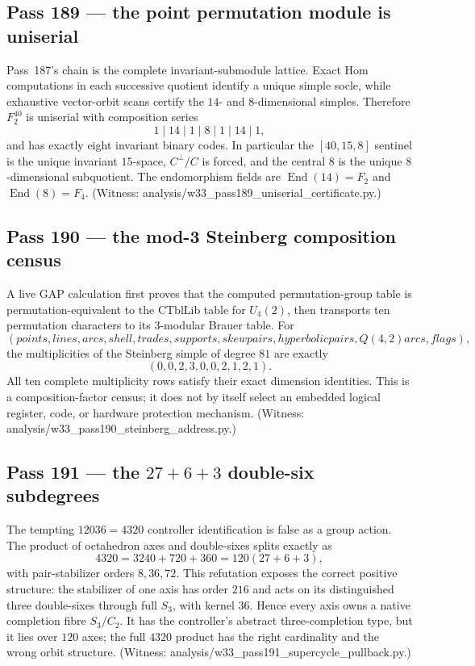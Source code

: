 \documentclass[12pt,a4paper]{article}
\def\mathbb#1{#1}%
\def\texttt#1{#1}%
\def\text#1{#1}%
\def\cdot{ }%
\theoremstyle{definition}
\begin{document}
\subsection{Pass 189 --- the point permutation module is uniserial}
\label{ssec:pass189}

Pass~187's chain is the complete invariant-submodule lattice.  Exact Hom
computations in each successive quotient identify a unique simple socle,
while exhaustive vector-orbit scans certify the $14$- and $8$-dimensional
simples.  Therefore $\mathbb F_2^{40}$ is uniserial with composition
series
\[
  1\mid14\mid1\mid8\mid1\mid14\mid1,
\]
and has exactly eight invariant binary codes.  In particular the
$[40,15,8]$ sentinel is the unique invariant $15$-space,
$C^\perp/C$ is forced, and the central $8$ is the unique
$8$-dimensional subquotient.  The endomorphism fields are
$\operatorname{End}(14)=\mathbb F_2$ and
$\operatorname{End}(8)=\mathbb F_4$. (Witness:
\texttt{analysis/w33\_pass189\_uniserial\_certificate.py}.)

\subsection{Pass 190 --- the mod-3 Steinberg composition census}
\label{ssec:pass190}

A live GAP calculation first proves that the computed permutation-group
table is permutation-equivalent to the CTblLib table for $U_4(2)$, then
transports ten permutation characters to its $3$-modular Brauer table.
For
\[
 (\text{points, lines, arcs, shell, trades, supports, skew pairs,
 hyperbolic pairs, }Q(4,2)\text{ arcs, flags}),
\]
the multiplicities of the Steinberg simple of degree $81$ are exactly
\[
  \boxed{(0,0,2,3,0,0,2,1,2,1)}.
\]
All ten complete multiplicity rows satisfy their exact dimension
identities.  This is a composition-factor census; it does not by itself
select an embedded logical register, code, or hardware protection
mechanism. (Witness:
\texttt{analysis/w33\_pass190\_steinberg\_address.py}.)

\subsection{Pass 191 --- the $27+6+3$ double-six subdegrees}
\label{ssec:pass191}

The tempting $120\cdot36=4320$ controller identification is false as a
group action.  The product of octahedron axes and double-sixes splits
exactly as
\[
  \boxed{4320=3240+720+360=120(27+6+3)},
\]
with pair-stabilizer orders $8,36,72$.  This refutation exposes the
correct positive structure: the stabilizer of one axis has order $216$
and acts on its distinguished three double-sixes through full $S_3$,
with kernel $36$.  Hence every axis owns a native completion fibre
$S_3/C_2$.  It has the controller's abstract three-completion type, but
it lies over $120$ axes; the full $4320$ product has the right cardinality
and the wrong orbit structure. (Witness:
\texttt{analysis/w33\_pass191\_supercycle\_pullback.py}.)
\end{document}
